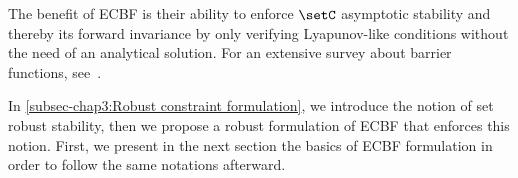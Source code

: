 The benefit of ECBF is their ability to enforce $\setC$ asymptotic stability and thereby its forward invariance by only verifying Lyapunov-like conditions without the need of an analytical solution. %
For an extensive survey about barrier functions, see~\cite{ames2019ecc}.  

In \cref{subsec-chap3:Robust constraint formulation}, we introduce the notion of set robust stability, then we propose a robust formulation of ECBF that enforces this notion. First, we present in the next section the basics of ECBF formulation in order to follow the same notations afterward. 
 



